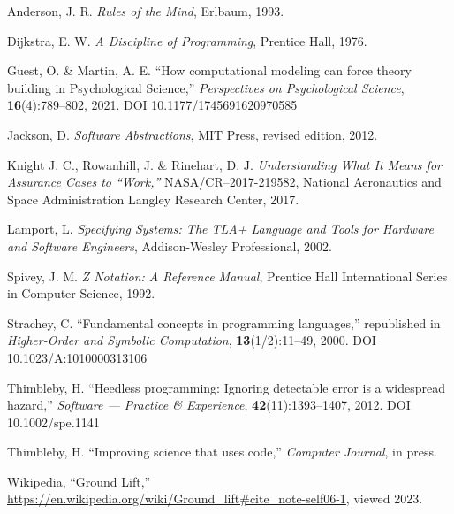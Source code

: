 \documentclass[11pt]{article}
\begin{document}
\begin{thebibliography}{99}

Anderson, J. R. \emph{Rules of the Mind}, Erlbaum, 1993.

Dijkstra, E. W. \emph{A Discipline of Programming}, Prentice Hall, 1976.

Guest, O. \& Martin, A. E. ``How computational modeling can force theory building in Psychological Science,'' \emph{Perspectives on Psychological Science}, \textbf{16}(4):789--802, 2021. DOI 10.1177/1745691620970585

Jackson, D. \emph{Software Abstractions}, MIT Press, revised edition, 2012.

Knight J. C.,  Rowanhill, J. \& Rinehart, D. J. \emph{Understanding What It Means for Assurance Cases to ``Work,''}
NASA/CR–2017-219582, National Aeronautics and Space Administration
Langley Research Center, 2017.

Lamport, L. \emph{Specifying Systems: The TLA+ Language and Tools for Hardware and Software Engineers}, Addison-Wesley Professional, 2002.

Spivey, J. M. \emph{Z Notation: A Reference Manual}, Prentice Hall International Series in Computer Science, 1992.

Strachey, C. ``Fundamental concepts in programming languages,'' republished in \emph{Higher-Order and Symbolic Computation}, %
\textbf{13}(1/2):11--49, 2000. DOI 10.1023/A:1010000313106

Thimbleby, H. ``Heedless programming: {I}gnoring detectable error is a widespread hazard,'' \emph{Software --- Practice {\&} Experience}, \textbf{42}(11):1393--1407, 2012.
DOI 10.1002/spe.1141

Thimbleby, H. ``Improving science that uses code,'' \emph{Computer Journal}, in press.

Wikipedia, ``Ground Lift,''
\url{https://en.wikipedia.org/wiki/Ground_lift#cite_note-self06-1}, viewed 2023.

\end{thebibliography}
\end{document}
